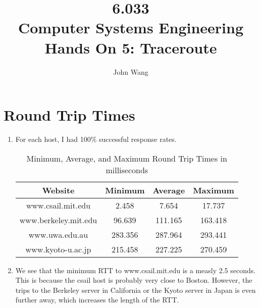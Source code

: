\documentclass[psamsfonts]{amsart}
\title{6.033 \\
Computer Systems Engineering \\
Hands On 5: Traceroute}
\author{John Wang}
\begin{document}
\maketitle

\section{Round Trip Times}

\begin{enumerate}
  \item For each host, I had 100\% successful response rates.
    \begin{table}[H]
      \begin{tabular}{c | c c c}
        Website & Minimum & Average & Maximum \\
        \hline \hline
        www.csail.mit.edu & 2.458 & 7.654 & 17.737 \\
     www.berkeley.mit.edu & 96.639 & 111.165 & 163.418 \\
           www.uwa.edu.au & 283.356 & 287.964 & 293.441 \\
        www.kyoto-u.ac.jp & 215.458 & 227.225 & 270.459
      \end{tabular}
    \caption{Minimum, Average, and Maximum Round Trip Times in milliseconds}
    \end{table}

  \item We see that the minimum RTT to www.csail.mit.edu is a measly 2.5 seconds. This is because the csail host is probably very close to Boston. However, the trips to the Berkeley server in California or the Kyoto server in Japan is even further away, which increases the length of the RTT.


\end{enumerate}
\end{document}
